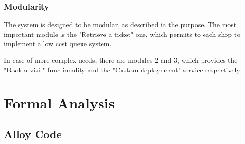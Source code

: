 \documentclass[table, 12pt]{article}
\begin{document}
\subsubsection{Modularity}
The system is designed to be modular, as described in the purpose. The most important module is the "Retrieve a ticket" one, which permits to each shop to implement a low cost queue system.

In case of more complex needs, there are modules 2 and 3, which provides the "Book a visit" functionality and the "Custom deploymeent" service respectively.
\newpage
\section{Formal Analysis}
\subsection{Alloy Code}
\end{document}
